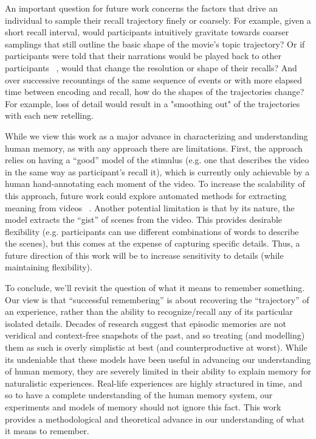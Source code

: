 \documentclass{article}
\begin{document}
{An important question for future work concerns the factors that drive an individual to sample their recall trajectory finely or coarsely. For example, given a short recall interval, would participants intuitively gravitate towards coarser samplings that still outline the basic shape of the movie's topic trajectory? Or if participants were told that their narrations would be played back to other participants ~\citep{ZadbEtal17}, would that change the resolution or shape of their recalls? And over successive recountings of the same sequence of events or with more elapsed time between encoding and recall, how do the shapes of the trajectories change? For example, loss of detail would result in a "smoothing out" of the trajectories with each new retelling.

While we view this work as a major advance in characterizing and understanding human memory, as with any approach there are limitations. First, the approach relies on having a ``good'' model of the stimulus (e.g. one that describes the video in the same way as participant's recall it), which is currently only achievable by a human hand-annotating each moment of the video.  To increase the scalability of this approach, future work could explore automated methods for extracting meaning from videos ~\citep{YuEtal16}.  Another potential limitation is that by its nature, the model extracts the ``gist'' of scenes from the video.  This provides desirable flexibility (e.g. participants can use different combinations of words to describe the scenes), but this comes at the expense of capturing specific details.  Thus, a future direction of this work will be to increase sensitivity to details (while maintaining flexibility).

To conclude, we'll revisit the question of what it means to remember something. Our view is that ``successful remembering'' is about recovering the ``trajectory'' of an experience, rather than the ability to recognize/recall any of its particular isolated details. Decades of research suggest that episodic memories are not veridical and context-free snapshots of the past, and so treating (and modelling) them as such is overly simplistic at best (and counterproductive at worst). While its undeniable that these models have been useful in advancing our understanding of human memory, they are severely limited in their ability to explain memory for naturalistic experiences. Real-life experiences are highly structured in time, and so to have a complete understanding of the human memory system, our experiments and models of memory should not ignore this fact. This work provides a methodological and theoretical advance in our understanding of what it means to remember.

}
\end{document}
